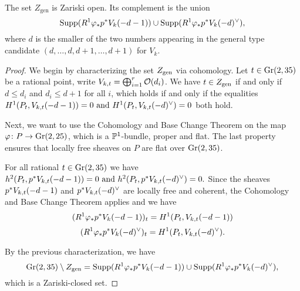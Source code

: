 




\begin{proposition}
	The set $Z_{\text{gen}}$ is Zariski open. Its complement is the union
	\[
		\operatorname{Supp}(R^1 \varphi_{*}p^{*} V_{k}(-d-1)) \cup
		\operatorname{Supp}(R^1 \varphi_{*}p^{*} V_{k}(-d)^\vee),
	\]
	where $d$ is the smaller of the two numbers appearing in the general type candidate $(d,\dotsc,d,d+1,\dotsc,d+1)$ for $V_k$.
\end{proposition}
\begin{proof}
	We begin by characterizing the set $Z_{\text{gen}}$ via cohomology. Let $t\in \operatorname{Gr}(2,35)$ be a rational point, write $V_{k,t}=\bigoplus_{i=1}^r \mathcal{O}(d_i)$. We have $t\in Z_{\text{gen}}$ if and only if $d\leq d_i$ and $d_i \leq d+1$ for all $i$, which holds if and only if the equalities
	$
	H^1(P_t, V_{k,t}(-d-1))=0
	\text{ and }
	H^1(P_t, V_{k,t}(-d)^\vee)=0
	$
	both hold.

	Next, we want to use the Cohomology and Base Change Theorem \cite[{}28.1.6]{vakil-algebraic-geometry} on the map 
	$\varphi \colon P \to \operatorname{Gr}(2,25)$, which is a $\mathbb{P}^1$-bundle, proper and flat. The last property ensures that locally free sheaves on $P$ are flat over $\operatorname{Gr}(2,35)$.

	For all rational $t\in \operatorname{Gr}(2,35)$ we have
	$
	h^2(P_t, p^{*}V_{k,t}(-d-1)) = 0
	\text{ and }
	h^2(P_t,p^{*}V_{k,t}(-d)^\vee)=0.
	$
	Since the sheaves $p^{*}V_{k,t}(-d-1)$ and $p^{*}V_{k,t}(-d)^\vee$ are locally free and coherent, the Cohomology and Base Change Theorem applies and we have 
	\[(R^1 \varphi_{*}p^{*} V_{k}(-d-1))_t = H^1(P_t,V_{k,t}(-d-1))\]
	\[
	(R^1 \varphi_{*}p^{*} V_{k}(-d)^\vee)_t = H^1(P_t,V_{k,t}(-d)^\vee).
	\]

	By the previous characterization, we have
	\[
		\operatorname{Gr}(2,35) \setminus Z_{\text{gen}} =
		\operatorname{Supp}(R^1 \varphi_{*}p^{*} V_{k}(-d-1)) \cup
		\operatorname{Supp}(R^1 \varphi_{*}p^{*} V_{k}(-d)^\vee),
	\]
	which is a Zariski-closed set.
\end{proof}

